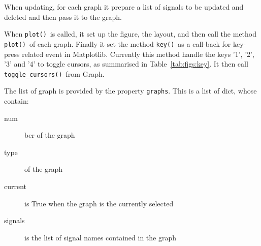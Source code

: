 \documentclass[a4paper,11pt]{article}
\newcommand{\meth}[1]{\texttt{#1()}}
\newcommand{\cls}[1]{\textsf{#1}}
\newcommand{\prop}[1]{\texttt{#1}}
\newcommand{\graph}{\cls{Graph}}
\begin{document}
When updating, for each graph it prepare a list of signals to be updated and deleted and then pass it to the graph.

When \meth{plot}\ is called, it set up the figure, the layout, and then call the method \meth{plot}\ of each graph.
Finally it set the method \meth{key}\ as a call-back for key-press related event in Matplotlib.
Currently this method handle the keys '1', '2', '3' and '4' to toggle cursors, as summarised in Table~\ref{tab:figs:key}.
It then call \meth{toggle\_cursors}\ from \graph.

The list of graph is provided by the property \prop{graphs}.
This is a list of dict, whose contain:
\begin{description}
\item[num]ber of the graph
\item[type] of the graph
\item[current] is True when the graph is the currently selected
\item[signals] is the list of signal names contained in the graph
\end{description}
\end{document}
